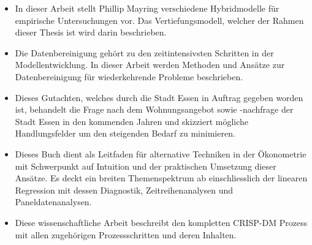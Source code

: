 \begin{itemize}
    \item In dieser Arbeit stellt Phillip Mayring verschiedene Hybridmodelle für empirische
    Untersuchungen vor. Das Vertiefungsmodell, welcher der Rahmen dieser Thesis ist wird
    darin beschrieben.
\end{itemize}

\begin{itemize}
    \item Die Datenbereinigung gehört zu den zeitintensivsten 
    Schritten in der Modellentwicklung. In dieser Arbeit werden Methoden 
    und Ansätze zur Datenbereinigung für wiederkehrende Probleme beschrieben. 
\end{itemize}
\newpage
{}
\begin{itemize}
    \item Dieses Gutachten, welches durch die Stadt Essen in Auftrag gegeben worden ist, 
    behandelt die Frage nach dem Wohnungsangebot sowie -nachfrage der Stadt Essen in den kommenden Jahren 
    und skizziert mögliche Handlungsfelder um den steigenden Bedarf zu minimieren. 
\end{itemize}

\begin{itemize}
    \item Dieses Buch dient als Leitfaden für alternative Techniken in der Ökonometrie mit 
    Schwerpunkt auf Intuition und der praktischen Umsetzung dieser Ansätze. Es deckt 
    ein breiten Themenspektrum ab einschliesslich der linearen Regression mit dessen 
    Diagnostik, Zeitreihenanalysen und Paneldatenanalysen. 
\end{itemize}

\begin{itemize}
    \item Diese wissenschaftliche Arbeit beschreibt den kompletten CRISP-DM Prozess 
    mit allen zugehörigen Prozessschritten und deren Inhalten. 
\end{itemize}